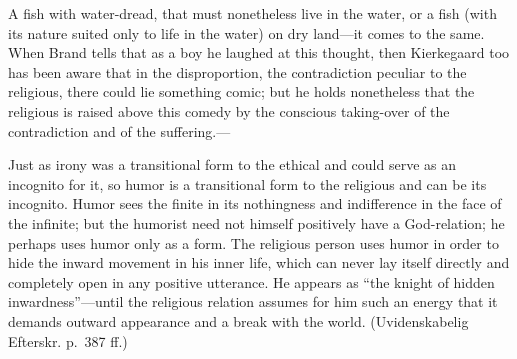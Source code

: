 \documentclass[12pt,a4paper]{book}
\newcommand{\opage}[1]{\marginnote{\footnotesize\textit{[#1]}}}
\begin{document}
A fish with water-dread, that must nonetheless live in the water, or a
fish (with its nature suited only to life in the water) on dry land---it
comes to the same. When Brand tells that as a boy he laughed at this
thought, then Kierkegaard too has been aware that in the disproportion,
the contradiction peculiar to the religious, there could lie something
comic; but he holds nonetheless that the religious is raised above this
comedy by the conscious taking-over of the contradiction and of the
suffering.---

Just as irony was a transitional form to the ethical and could serve as an
incognito for it, so humor is a transitional form to the religious and can
be its incognito. Humor sees the finite in its nothingness and
indifference in the face of the infinite; but the humorist need not
himself positively have a God-relation; he perhaps uses humor only as a
form. The religious person uses humor in order to hide the inward movement
in his inner life, which can never lay itself directly and completely open
in any positive
\opage{114}utterance. He appears as ``the knight of hidden
inwardness''---until the religious relation assumes for him such an energy
that it demands outward appearance and a break with the world.
(Uvidenskabelig Efterskr. p.~387 ff.)
\end{document}
